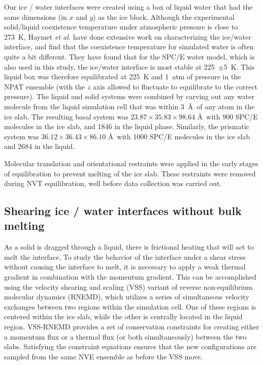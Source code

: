 Our ice / water interfaces were created using a box of liquid water
that had the same dimensions (in $x$ and $y$) as the ice block.
Although the experimental solid/liquid coexistence temperature under
atmospheric pressure is close to 273~K, Haymet \emph{et al.} have done
extensive work on characterizing the ice/water interface, and find
that the coexistence temperature for simulated water is often quite a
bit different.\cite{Karim88,Karim90,Hayward01,Bryk02,Hayward02} They
have found that for the SPC/E water model,\cite{Berendsen87} which is
also used in this study, the ice/water interface is most stable at
225~$\pm$5~K.\cite{Bryk02} This liquid box was therefore equilibrated at
225~K and 1~atm of pressure in the NPAT ensemble (with the $z$ axis
allowed to fluctuate to equilibrate to the correct pressure).  The
liquid and solid systems were combined by carving out any water
molecule from the liquid simulation cell that was within 3~\AA\ of any
atom in the ice slab. The resulting basal system was $23.87 \times 35.83
\times 98.64$ \AA\ with 900 SPC/E molecules in the ice slab, and 1846 in
the liquid phase.  Similarly, the prismatic system was $36.12 \times 36.43
\times 86.10$ \AA\ with 1000 SPC/E molecules in the ice slab and 2684 in
the liquid.

Molecular translation and orientational restraints were applied in the
early stages of equilibration to prevent melting of the ice slab.
These restraints were removed during NVT equilibration, well before
data collection was carried out.  

\subsection{Shearing ice / water interfaces without bulk melting}

As a solid is dragged through a liquid, there is frictional heating
that will act to melt the interface.  To study the behavior of the
interface under a shear stress without causing the interface to melt,
it is necessary to apply a weak thermal gradient in combination with
the momentum gradient.  This can be accomplished using the velocity
shearing and scaling (VSS) variant of reverse non-equilibrium
molecular dynamics (RNEMD), which utilizes a series of simultaneous
velocity exchanges between two regions within the simulation
cell.\cite{Kuang12} One of these regions is centered within the ice
slab, while the other is centrally located in the liquid
region. VSS-RNEMD provides a set of conservation constraints for
creating either a momentum flux or a thermal flux (or both
simultaneously) between the two slabs.  Satisfying the constraint
equations ensures that the new configurations are sampled from the
same NVE ensemble as before the VSS move.

